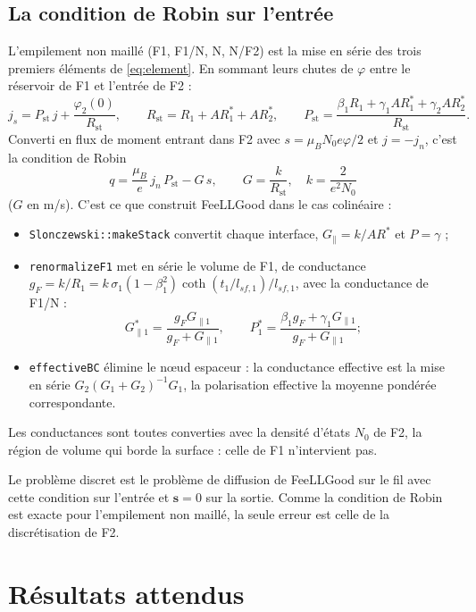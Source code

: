 \documentclass[11pt,a4paper]{article}
\newcommand{\vs}{\bm{s}}
\begin{document}
\subsection{La condition de Robin sur l'entrée}

L'empilement non maillé (F1, F1/N, N, N/F2) est la mise en série des trois
premiers éléments de \eqref{eq:element}. En sommant leurs chutes de
$\varphi$ entre le réservoir de F1 et l'entrée de F2 :
\begin{equation}
  j_s = P_{\mathrm{st}}\,j + \frac{\varphi_2(0)}{R_{\mathrm{st}}},
  \qquad
  R_{\mathrm{st}} = R_1 + AR_1^* + AR_2^*,
  \qquad
  P_{\mathrm{st}} = \frac{\beta_1R_1 + \gamma_1AR_1^* + \gamma_2AR_2^*}{R_{\mathrm{st}}} .
\end{equation}
Converti en flux de moment entrant dans F2 avec $s = \mu_BN_0e\varphi/2$
et $j = -j_n$, c'est la condition de Robin
\begin{equation}
  \boxed{\;q = \frac{\mu_B}{e}\,j_n\,P_{\mathrm{st}} - G\,s,
  \qquad G = \frac{k}{R_{\mathrm{st}}},\quad k = \frac{2}{e^2N_0}\;}
\end{equation}
($G$ en m/s). C'est ce que construit FeeLLGood dans le cas colinéaire :
\begin{itemize}
  \item \texttt{Slonczewski::makeStack} convertit chaque interface,
    $G_\parallel = k/AR^*$ et $P = \gamma$ ;
  \item \texttt{renormalizeF1} met en série le volume de F1, de
    conductance $g_F = k/R_1 = k\,\sigma_1(1-\beta_1^2)\coth(t_1/l_{sf,1})/l_{sf,1}$,
    avec la conductance de F1/N :
    \[
      G_{\parallel1}^* = \frac{g_FG_{\parallel1}}{g_F+G_{\parallel1}},
      \qquad
      P_1^* = \frac{\beta_1g_F + \gamma_1G_{\parallel1}}{g_F+G_{\parallel1}} ;
    \]
  \item \texttt{effectiveBC} élimine le nœud espaceur : la conductance
    effective est la mise en série $G_2(G_1+G_2)^{-1}G_1$, la polarisation
    effective la moyenne pondérée correspondante.
\end{itemize}
Les conductances sont toutes converties avec la densité d'états $N_0$ de
F2, la région de volume qui borde la surface : celle de F1 n'intervient
pas.

Le problème discret est le problème de diffusion de FeeLLGood sur le fil
avec cette condition sur l'entrée et $\vs = 0$ sur la sortie. Comme la
condition de Robin est exacte pour l'empilement non maillé, la seule
erreur est celle de la discrétisation de F2.

\section{Résultats attendus}
\end{document}

